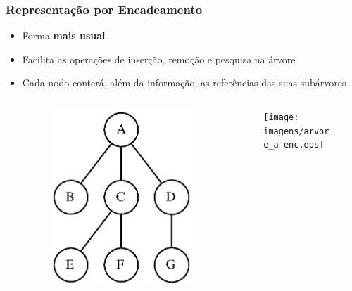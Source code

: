 \documentclass[aspectratio=169]{beamer}
\begin{document}
\begin{frame}[fragile]\frametitle{Representação por Encadeamento}
\begin{itemize}
	\item Forma \textbf{mais usual}
	\item Facilita as operações de inserção, remoção e pesquisa na árvore
	\item Cada nodo conterá, além da informação, as referências das suas subárvores
\begin{columns}[T]
\begin{column}{0.30\linewidth}
\begin{figure}[h]
	\centering
	\includegraphics[height=0.4\paperheight]{imagens/arvore_a.eps}
\end{figure}
\end{column}
\begin{column}{0.70\linewidth}
\begin{figure}[h]
	\centering
	\texttt{[image: imagens/arvore\_a-enc.eps]}
\end{figure}
\end{column}
\end{columns}
\end{itemize}
\end{frame}
\end{document}
